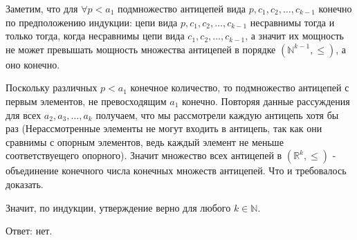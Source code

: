 \documentclass[12pt]{article}
\begin{document}
	Заметим, что для $\forall p < a_1$ подмножество антицепей вида $p, c_1, c_2, \dots, c_{k-1}$ конечно
	по предположению индукции: цепи вида $p, c_1, c_2, \dots, c_{k-1}$ несравнимы тогда и только тогда, когда несравнимы цепи вида $c_1, c_2, \dots, c_{k-1}$, а значит их мощность не может превышать мощность множества антицепей в порядке $(\mathbb{N}^{k-1}, \leqslant)$, а оно конечно. 
	
	Поскольку различных $p < a_1$ конечное количество, то подмножество антицепей с первым элементов, не превосходящим $a_1$ конечно. Повторяя данные рассуждения для всех $a_2, a_3, \dots, a_k$ получаем, что мы рассмотрели каждую антицепь хотя бы раз
	(Нерассмотренные элементы не могут входить в антицепь, так как они сравнимы с опорным элементов, ведь каждый элемент не меньше соответствуещего опорного).
	 Значит множество всех антицепей в $(\mathbb{R}^k, \leqslant)$ - объединение конечного числа конечных множеств антицепей. Что и требовалось доказать.
	 
	 Значит, по индукции, утверждение верно для любого $k \in \mathbb{N}$.
	
	Ответ: нет.	
	
\end{document}
